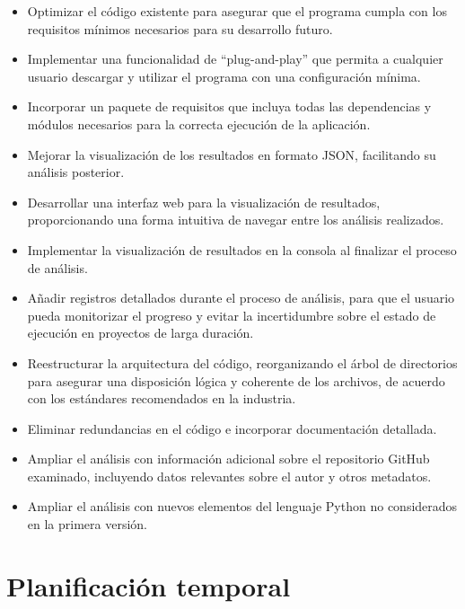 \documentclass[a4paper, 12pt]{book}
\begin{document}
\begin{itemize} 
    \item Optimizar el código existente para asegurar que el programa cumpla con los requisitos mínimos necesarios para su desarrollo futuro. 
    \item Implementar una funcionalidad de ``plug-and-play'' que permita a cualquier usuario descargar y utilizar el programa con una configuración mínima. 
    \item Incorporar un paquete de requisitos que incluya todas las dependencias y módulos necesarios para la correcta ejecución de la aplicación. 
    \item Mejorar la visualización de los resultados en formato JSON, facilitando su análisis posterior. 
    \item Desarrollar una interfaz web para la visualización de resultados, proporcionando una forma intuitiva de navegar entre los análisis realizados. 
    \item Implementar la visualización de resultados en la consola al finalizar el proceso de análisis. 
    \item Añadir registros detallados durante el proceso de análisis, para que el usuario pueda monitorizar el progreso y evitar la incertidumbre sobre el estado de ejecución en proyectos de larga duración. 
    \item  Reestructurar la arquitectura del código, reorganizando el árbol de directorios para asegurar una disposición lógica y coherente de los archivos, de acuerdo con los estándares recomendados en la industria. 
    \item Eliminar redundancias en el código e incorporar documentación detallada. 
    \item Ampliar el análisis con información adicional sobre el repositorio GitHub examinado, incluyendo datos relevantes sobre el autor y otros metadatos.
    \item Ampliar el análisis con nuevos elementos del lenguaje Python no considerados en la primera versión.
\end{itemize}
\section{Planificación temporal}
\label{sec:planificacion-temporal}

\end{document}
